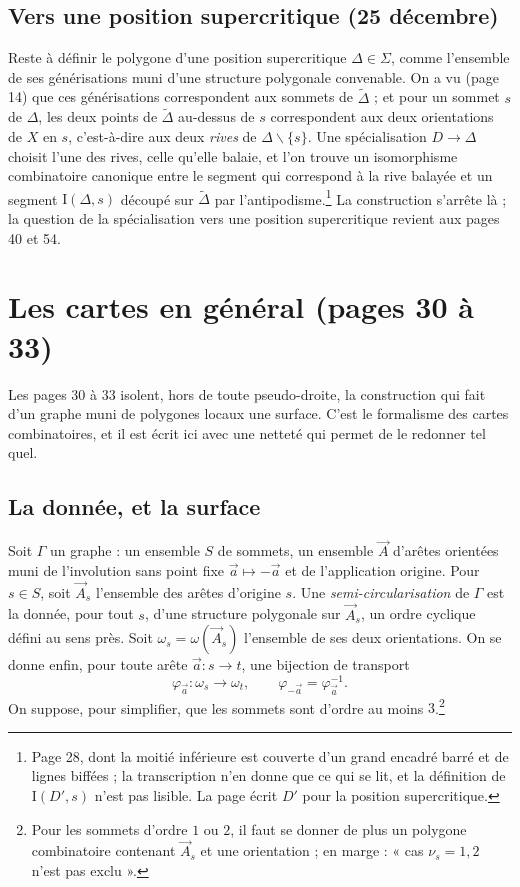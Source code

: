 \documentclass[11pt,a4paper]{article}
\begin{document}
\subsection*{Vers une position supercritique (25 décembre)}

Reste à définir le polygone d'une position supercritique $\Delta \in \Sigma$,
comme l'ensemble de ses générisations muni d'une structure polygonale
convenable. On a vu (page 14) que ces générisations correspondent aux sommets
de $\widetilde{\Delta}$ ; et pour un sommet $s$ de $\Delta$, les deux points de
$\widetilde{\Delta}$ au-dessus de $s$ correspondent aux deux orientations de $X$
en $s$, c'est-à-dire aux deux \emph{rives} de $\Delta \smallsetminus \lbrace s
\rbrace$. Une spécialisation $D \to \Delta$ choisit l'une des rives, celle
qu'elle balaie, et l'on trouve un isomorphisme combinatoire canonique entre le
segment qui correspond à la rive balayée et un segment $\mathrm{I}(\Delta, s)$
découpé sur $\widetilde{\Delta}$ par l'antipodisme.\footnote{Page 28, dont la
moitié inférieure est couverte d'un grand encadré barré et de lignes biffées ;
la transcription n'en donne que ce qui se lit, et la définition de
$\mathrm{I}(D', s)$ n'est pas lisible. La page écrit $D'$ pour la position
supercritique.} La construction s'arrête là ; la question de la spécialisation
vers une position supercritique revient aux pages 40 et 54.

\section*{Les cartes en général (pages 30 à 33)}

Les pages 30 à 33 isolent, hors de toute pseudo-droite, la construction qui
fait d'un graphe muni de polygones locaux une surface. C'est le formalisme des
cartes combinatoires, et il est écrit ici avec une netteté qui permet de le
redonner tel quel.

\subsection*{La donnée, et la surface}

Soit $\Gamma$ un graphe : un ensemble $S$ de sommets, un ensemble $\vec{A}$
d'arêtes orientées muni de l'involution sans point fixe $\vec{a} \mapsto
-\vec{a}$ et de l'application origine. Pour $s \in S$, soit $\vec{A}_s$
l'ensemble des arêtes d'origine $s$. Une \emph{semi-circularisation} de $\Gamma$
est la donnée, pour tout $s$, d'une structure polygonale sur $\vec{A}_s$, un
ordre cyclique défini au sens près. Soit $\omega_s = \omega(\vec{A}_s)$
l'ensemble de ses deux orientations. On se donne enfin, pour toute arête
$\vec{a} : s \to t$, une bijection de transport
\[
\varphi_{\vec{a}} : \omega_s \longrightarrow \omega_t , \qquad
\varphi_{-\vec{a}} = \varphi_{\vec{a}}^{-1} .
\]
On suppose, pour simplifier, que les sommets sont d'ordre au moins
$3$.\footnote{Pour les sommets d'ordre $1$ ou $2$, il faut se donner de plus un
polygone combinatoire contenant $\vec{A}_s$ et une orientation ; en marge : « cas
$\nu_s = 1, 2$ n'est pas exclu ».}
\end{document}
